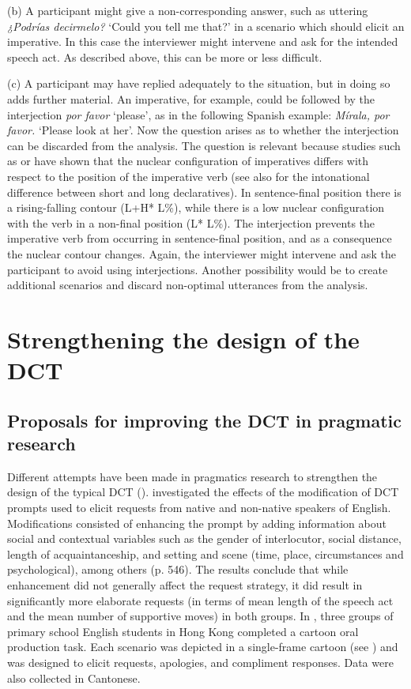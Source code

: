 \documentclass[output=paper]{LSP/langsci}
\begin{document}
(b) A participant might give a non-corresponding answer, such as uttering \textit{¿Podrías decirmelo?} ‘Could you tell me that?’ in a scenario which should elicit an imperative. In this case the interviewer might intervene and ask for the intended speech act. As described above, this can be more or less difficult.

(c) A participant may have replied adequately to the situation, but in doing so adds further material. An imperative, for example, could be followed by the interjection \textit{por favor} ‘please’, as in the following Spanish example: \textit{Mírala, por favor.} ‘Please look at her’. Now the question arises as to whether the interjection can be discarded from the analysis. The question is relevant because studies such as \citet{Brehm2014} or \citet{Lausecker2014} have shown that the nuclear configuration of imperatives differs with respect to the position of the imperative verb (see also \citealt{Prieto2002} for the intonational difference between short and long declaratives). In sentence-final position there is a rising-falling contour (L+H* L\%), while there is a low nuclear configuration with the verb in a non-final position (L* L\%). The interjection prevents the imperative verb from occurring in sentence-final position, and as a consequence the nuclear contour changes. Again, the interviewer might intervene and ask the participant to avoid using interjections. Another possibility would be to create additional scenarios and discard non-optimal utterances from the analysis.


\section{Strengthening the design of the DCT}
\label{sec:van:3}
\subsection{Proposals for improving the DCT in pragmatic research}
\label{sec:van:3.1}

Different attempts have been made in pragmatics research to strengthen the design of the typical DCT (\citealt{Billmyer2000,Rose2000,Cohen2003,Schauer2004,McLean2005}). \citet{Billmyer2000} investigated the effects of the modification of DCT prompts used to elicit requests from native and non-native speakers of English. Modifications consisted of enhancing the prompt by adding information about social and contextual variables such as the gender of interlocutor, social distance, length of acquaintanceship, and setting and scene (time, place, circumstances and psychological), among others (p. 546). The results conclude that while enhancement did not generally affect the request strategy, it did result in significantly more elaborate requests (in terms of mean length of the speech act and the mean number of supportive moves) in both groups. In \citet{Rose2000}, three groups of primary school English students in Hong Kong completed a cartoon oral production task. Each scenario was depicted in a single-frame cartoon (see ) and was designed to elicit requests, apologies, and compliment responses. Data were also collected in Cantonese. 
\end{document}
